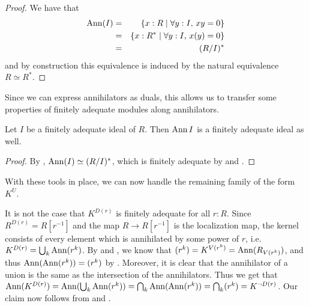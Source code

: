 \begin{proof}
  We have that
  \begin{eqnarray*}
    \operatorname{Ann}(I) & = & \{x:R \mid \forall y:I,\, xy = 0\} \\
    & = & \{x:R^\ast \mid \forall y:I,\, x(y) = 0\} \\
    & = & (R/I)^\ast
  \end{eqnarray*}
  and by construction this equivalence is induced by the natural equivalence $R \simeq R^*$.
\end{proof}

Since we can express annihilators as duals, this allows us to transfer some properties of finitely adequate modules along annihilators.

\begin{proposition}\label{prp:ann-fin-adeq}
  Let $I$ be a finitely adequate ideal of $R$.
  Then $\operatorname{Ann}{I}$ is a finitely adequate ideal as well.
\end{proposition}

\begin{proof}
  By , $\operatorname{Ann}(I) \simeq (R/I)^*$,
  which is finitely adequate by  and .
\end{proof}

With these tools in place, we can now handle the remaining family of the form $K^U$.

\begin{counterexample}\label{cex:K^Dr-not-fin-adeq}
  It is not the case that $K^{D(r)}$ is finitely adequate for all $r : R$.
  Since $R^{D(r)} = R[r^{-1}]$ and the map $R \to R[r^{-1}]$ is the localization map, the kernel consists of every element which is annihilated by some power of $r$, i.e.\ $K^{D(r)} = \bigcup_k \operatorname{Ann}(r^k)$.
  By  and , we know that $(r^k) = K^{V(r^k)} = \operatorname{Ann}(R_{V(r^k)})$, and thus $\operatorname{Ann}(\operatorname{Ann}(r^k)) = (r^k)$ by .
  Moreover, it is clear that the annihilator of a union is the same as the intersection of the annihilators.
  Thus we get that $\operatorname{Ann}(K^{D(r)}) = \operatorname{Ann}(\bigcup_k \operatorname{Ann}(r^k)) = \bigcap_k \operatorname{Ann}(\operatorname{Ann}(r^k)) = \bigcap_k (r^k) = K^{\lnot D(r)}$.
  Our claim now follows from  and .
\end{counterexample}

